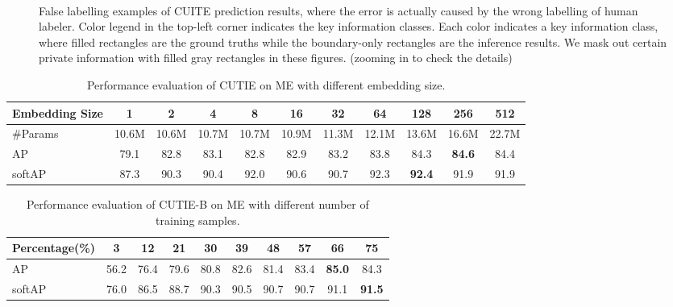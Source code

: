 \documentclass[10pt,twocolumn,letterpaper]{article}
\begin{document}
\begin{figure}
\begin{center}
\\
\end{center}
   \caption{False labelling examples of CUITE prediction results, where the error is actually caused by the wrong labelling of human labeler. Color legend in the top-left corner indicates the key information classes. Each color indicates a key information class, where filled rectangles are the ground truths while the boundary-only rectangles are the inference results. We mask out certain private information with filled gray rectangles in these figures. (zooming in to check the details)}
\label{fig:falselabel}
\end{figure}

\begin{table}
	\caption{Performance evaluation of CUTIE on ME with different embedding size.}
\begin{center}
\begin{tabular}{l | c | c | c | c | c | c | c | c | c | c}
	Embedding Size & 1 & 2 & 4 & 8 & 16 & 32 & 64 & 128 & 256 & 512 \\
	\hline
	\#Params & 10.6M & 10.6M & 10.7M & 10.7M & 10.9M & 11.3M & 12.1M & 13.6M & 16.6M & 22.7M \\
	AP & 79.1 & 82.8 & 83.1 & 82.8 & 82.9 & 83.2 & 83.8 & 84.3 & \textbf{84.6} & 84.4 \\
	softAP & 87.3 & 90.3 & 90.4 & 92.0 & 90.6 & 90.7 & 92.3 & \textbf{92.4} & 91.9 & 91.9 \\
\end{tabular}
\end{center}
	\label{tab:embedding}
\end{table}

\begin{table}
	\caption{Performance evaluation of CUTIE-B on ME with different number of training samples.}
\begin{center}
\begin{tabular}{l | c | c | c | c | c | c | c | c | c}
	Percentage(\%) & 3 & 12 & 21 & 30 & 39 & 48 & 57 & 66 & 75 \\
	\hline
	AP & 56.2 & 76.4 & 79.6 & 80.8 & 82.6 & 81.4 & 83.4 & \textbf{85.0} & 84.3 \\
	softAP & 76.0 & 86.5 & 88.7 & 90.3 & 90.5 & 90.7 & 90.7 & 91.1 & \textbf{91.5} \\
\end{tabular}
\end{center}
	\label{tab:samples}
\end{table}
\end{document}
